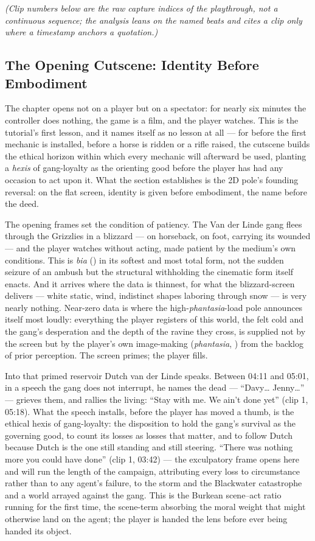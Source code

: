 \textit{(Clip numbers below are the raw capture indices of the playthrough, not a continuous sequence; the analysis leans on the named beats and cites a clip only where a timestamp anchors a quotation.)}

\bigskip

\subsection*{The Opening Cutscene: Identity Before Embodiment}

The chapter opens not on a player but on a spectator: for nearly six minutes the controller does nothing, the game is a film, and the player watches. This is the tutorial's first lesson, and it names itself as no lesson at all — for before the first mechanic is installed, before a horse is ridden or a rifle raised, the cutscene builds the ethical horizon within which every mechanic will afterward be used, planting a \textit{hexis} of gang-loyalty as the orienting good before the player has had any occasion to act upon it. What the section establishes is the 2D pole's founding reversal: on the flat screen, identity is given before embodiment, the name before the deed.

The opening frames set the condition of patiency. The Van der Linde gang flees through the Grizzlies in a blizzard — on horseback, on foot, carrying its wounded — and the player watches without acting, made patient by the medium's own conditions. This is \textit{bia} () in its softest and most total form, not the sudden seizure of an ambush but the structural withholding the cinematic form itself enacts. And it arrives where the data is thinnest, for what the blizzard-screen delivers — white static, wind, indistinct shapes laboring through snow — is very nearly nothing. Near-zero data is where the high-\textit{phantasia}-load pole announces itself most loudly: everything the player registers of this world, the felt cold and the gang's desperation and the depth of the ravine they cross, is supplied not by the screen but by the player's own image-making (\textit{phantasia}, ) from the backlog of prior perception. The screen primes; the player fills.

Into that primed reservoir Dutch van der Linde speaks. Between 04:11 and 05:01, in a speech the gang does not interrupt, he names the dead — ``Davy… Jenny…'' — grieves them, and rallies the living: ``Stay with me. We ain't done yet'' (clip 1, 05:18). What the speech installs, before the player has moved a thumb, is the ethical hexis of gang-loyalty: the disposition to hold the gang's survival as the governing good, to count its losses as losses that matter, and to follow Dutch because Dutch is the one still standing and still steering. ``There was nothing more you could have done'' (clip 1, 03:42) — the exculpatory frame opens here and will run the length of the campaign, attributing every loss to circumstance rather than to any agent's failure, to the storm and the Blackwater catastrophe and a world arrayed against the gang. This is the Burkean scene–act ratio running for the first time, the scene-term absorbing the moral weight that might otherwise land on the agent; the player is handed the lens before ever being handed its object.

